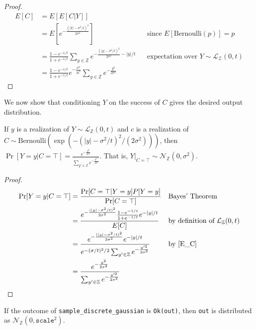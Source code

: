 \documentclass{article}
\begin{document}
\begin{proof} 
    \begin{align*} 
        E[C] &= E[E[C|Y]] \\ 
        &= E[e^{-\frac{(|Y| - \sigma^2/t)^2}{2\sigma^2}}] && \text{since } E[\mathrm{Bernoulli}(p)] = p \\ 
        &= \frac{1 - e^{-1/t}}{1 + e^{-1/t}} \sum_{y\in \mathbb{Z}} e^{-\frac{(|y| - \sigma^2/t)^2}{2\sigma^2} - |y|/t} && \text{expectation over } Y \sim \mathcal{L}_\mathcal{Z}(0, t) \\ 
        &= \frac{1 - e^{-1/t}}{1 + e^{-1/t}}e^{-\frac{\sigma^2}{2t^2}} \sum_{y\in \mathbb{Z}} e^{-\frac{y^2}{2\sigma^2}} 
    \end{align*} 
\end{proof} 
 
We now show that conditioning $Y$ on the success of $C$ gives the desired output distribution. 
\begin{theorem}\cite{CKS20} 
    \label{P_Yy_CT} If $y$ is a realization of $Y \sim \mathcal{L}_\mathbb{Z}(0, t)$ and $c$ is a realization of $C \sim \mathrm{Bernoulli}(\exp(-(|y| - \sigma^2 / t)^2 / (2 \sigma^2)))$, then 
    $\Pr[Y=y | C=\top] = \frac{e^{-\frac{y^2}{2\sigma^2}}}{\sum_{y' \in \mathbb{Z}} e^{-\frac{y'^2}{2\sigma^2}}}$. That is, $Y|_{C=\top} \sim \mathcal{N}_\mathbb{Z}(0, \sigma^2)$. 
\end{theorem} 
 
\begin{proof} 
    \begin{align*} 
        \Pr[Y=y | C=\top] &= \frac{\Pr[C=\top|Y=y]P[Y=y]}{\Pr[C=\top]} && \text{Bayes' Theorem} \\ 
        &= \frac{e^{-\frac{(|y| - \sigma^2/t)^2}{2\sigma^2}} \frac{1 - e^{-1/t}}{1 + e^{-1/t}} e^{-|y|/t}}{E[C]} && \text{by definition of } \mathcal{L}_\mathbb{Z}(0, t) \\ 
        &= \frac{e^{-\frac{(|y| - \sigma^2/t)^2}{2\sigma^2}} e^{-|y|/t}}{e^{-(\sigma/t)^2/2} \sum_{y' \in \mathbb{Z}} e^{-\frac{y'^2}{2\sigma^2}}} && \text{by } \ref{E_C}\\ 
        &= \frac{e^{-\frac{y^2}{2\sigma^2}}}{\sum_{y' \in \mathbb{Z}} e^{-\frac{y'^2}{2\sigma^2}}} 
    \end{align*} 
\end{proof} 
 
\begin{lemma}\label{ok-out} 
    If the outcome of \texttt{sample\_discrete\_gaussian} is \texttt{Ok(out)},  
    then \texttt{out} is distributed as $\mathcal{N}_\mathbb{Z}(0, \texttt{scale}^2)$. 
\end{lemma} 
 
\end{document}
